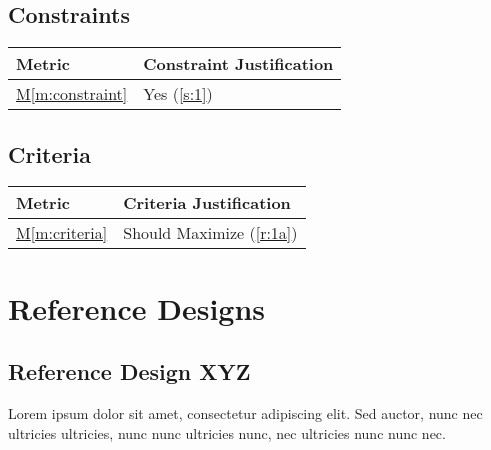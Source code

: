 \documentclass{../../../../docs/tex/report}
\newcommand{\mref}[1]{\hyperref[#1]{M\ref{#1}}}
\begin{document}
\clearpage


\subsection{Constraints}
\label{sec:constraints}

\begin{tabular}{|l|p{14.35cm}|}
    \hline
    \textbf{Metric} & \textbf{Constraint \hfill Justification} \\
    \hline
    \mref{m:constraint} & Yes \hfill (\ref{s:1})\\
    \hline
\end{tabular}

\subsection{Criteria}
\label{sec:criteria}

\begin{tabular}{|l|p{14.35cm}|}
    \hline
    \textbf{Metric} & \textbf{Criteria \hfill Justification} \\
    \hline
    \mref{m:criteria} & Should Maximize \hfill (\ref{r:1a}) \\
    \hline
\end{tabular}


\newpage

\section{Reference Designs}


\subsection{Reference Design XYZ}

Lorem ipsum dolor sit amet, consectetur adipiscing elit. Sed auctor, nunc nec ultricies ultricies, nunc nunc ultricies nunc, nec ultricies nunc nunc nec.


% 
% 
\end{document}
